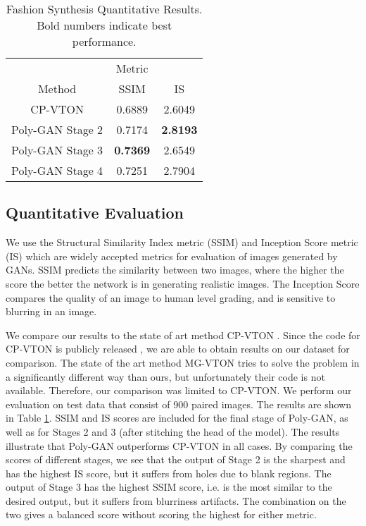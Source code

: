 \documentclass[11pt]{article}
\begin{document}
\begin{table}[h!]
\begin{center}
    \caption{Fashion Synthesis Quantitative Results. Bold numbers indicate best performance.}
    \label{tab:1}
\begin{tabular}{@{}ccc@{}}
\toprule
\multicolumn{1}{c}{} &   Metric      \\ \cmidrule(r){2-3}
Method     & SSIM & IS  \\ \midrule
CP-VTON &0.6889 & 2.6049     \\
Poly-GAN Stage 2 &0.7174 & \textbf{2.8193}      \\
Poly-GAN Stage 3 & \textbf{0.7369} & 2.6549      \\
Poly-GAN Stage 4 &0.7251 & 2.7904      \\ \bottomrule
\end{tabular}
\end{center}
\end{table}

\subsection{Quantitative Evaluation}
We use the Structural Similarity Index metric (SSIM) \citet{SSIM} and Inception Score metric (IS) \citet{Inception score} which are widely accepted metrics for evaluation of images generated by GANs. SSIM predicts the similarity between two images, where the higher the score the better the network is in generating realistic images. The Inception Score compares the quality of an image to human level grading, and is sensitive to blurring in an image.

We compare our results to the state of art method CP-VTON \citet{CP-VTON}. Since the code for CP-VTON is publicly released \citet{CP-VTON-Github}, we are able to obtain results on our dataset for comparison. 
The state of the art method MG-VTON \citet{MG-VTON} tries to solve the problem in a significantly different way than ours, but unfortunately their code is not available. Therefore, our comparison was limited to CP-VTON.
We perform our evaluation on test data that consist of 900 paired images. 
The results are shown in Table \ref{tab:1}. SSIM and IS scores are included for the final stage of Poly-GAN, as well as for Stages 2 and 3 (after stitching the head of the model). The results illustrate that Poly-GAN outperforms CP-VTON in all cases. By comparing the scores of different stages, we see that the output of Stage 2 is the sharpest and has the highest IS score, but it suffers from holes due to blank regions. The output of Stage 3 has the highest SSIM score, i.e. is the most similar to the desired output, but it suffers from blurriness artifacts. The combination on the two gives a balanced score without scoring the highest for either metric.    
\end{document}
